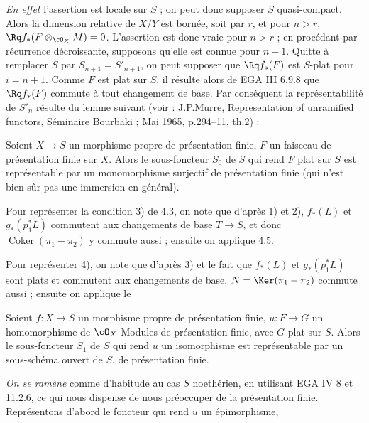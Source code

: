 \noindent\textit{En effet} l'assertion est locale sur $S$ ; on peut donc supposer $S$ quasi-compact. Alors la dimension relative de $X/Y$ est bornée, soit par $r$, et pour $n > r$, $\Rq f_*(F \otimes_{\cO_X} M) = 0$. L'assertion est donc vraie pour $n > r$ ; en procédant par récurrence décroissante, supposons qu'elle est connue pour $n+1$. Quitte à remplacer $S$ par $S_{n+1} = S'_{n+1}$, on peut supposer que $\Rq f_*(F)$ est $S$-plat pour $i = n+1$. Comme $F$ est plat sur $S$, il résulte alors de EGA III 6.9.8 que $\Rq f_*(F)$ commute à tout changement de base. Par conséquent la représentabilité de $S'_n$ résulte du lemme suivant (voir : J.P.\@ Murre, Representation of unramified functors, Séminaire Bourbaki ; Mai 1965, p.\@294--11, th.\@2) :

\begin{lem}\label{lem:4.5} Soient $X \to S$ un morphisme propre de présentation finie, $F$ un faisceau de présentation finie sur $X$. Alors le sous-foncteur $S_0$ de $S$ qui rend $F$ plat sur $S$ est représentable par un monomorphisme surjectif de présentation finie (qui n'est bien sûr pas une immersion en général).
\end{lem}

Pour représenter la condition 3) de 4.3, on note que d'après 1) et 2), $f_*(L)$ et $g_*(p_1^*L)$ commutent aux changements de base $T \to S$, et donc $\operatorname{Coker}(\pi_1 - \pi_2)$ y commute aussi ; ensuite on applique 4.5.

Pour représenter 4), on note que d'après 3) et le fait que $f_*(L)$ et $g_*(p_1^*L)$ sont plats et commutent aux changements de base, $N = \Ker(\pi_1 - \pi_2)$ commute aussi ; ensuite on applique le

\begin{lem}\label{lem:4.6} Soient $f : X \to S$ un morphisme propre de présentation finie, $u : F \to G$ un homomorphisme de $\cO_X$-Modules de présentation finie, avec $G$ plat sur $S$. Alors le sous-foncteur $S_1$ de $S$ qui rend $u$ un isomorphisme est représentable par un sous-schéma ouvert de $S$, de présentation finie.
\end{lem}

\noindent\textit{On se ramène} comme d'habitude au cas $S$ noethérien, en utilisant EGA IV 8 et 11.2.6, ce qui nous dispense de nous préoccuper de la présentation finie. Représentons d'abord le foncteur qui rend $u$ un épimorphisme,

